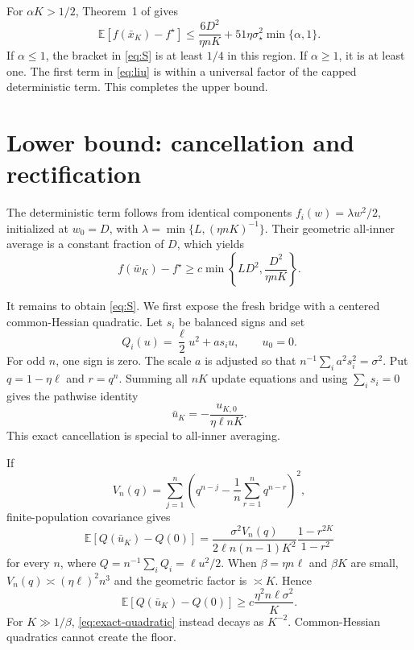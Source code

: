 \documentclass{article}
\theoremstyle{remark}
\newcommand{\E}{\mathbb E}
\newcommand{\1}{\mathbf 1}
\begin{document}
For $\alpha K>1/2$, Theorem~1 of \citet{liu2026dominates} gives
\begin{equation}
 \E[f(\bar x_K)-f^\star]
 \leq \frac{6D^2}{\eta nK}
 +51\eta\sigma_\star^2\min\{\alpha,1\}.               \label{eq:liu}
\end{equation}
If $\alpha\leq1$, the bracket in \eqref{eq:S} is at least $1/4$ in this region. If $\alpha\geq1$, it is at least one. The first term in \eqref{eq:liu} is within a universal factor of the capped deterministic term. This completes the upper bound.

\section{Lower bound: cancellation and rectification}
\label{sec:lower}

The deterministic term follows from identical components $f_i(w)=\lambda w^2/2$, initialized at $w_0=D$, with $\lambda=\min\{L,(\eta nK)^{-1}\}$. Their geometric all-inner average is a constant fraction of $D$, which yields
\begin{equation}
 f(\bar w_K)-f^\star
 \geq c\min\left\{LD^2,\frac{D^2}{\eta nK}\right\}.   \label{eq:det-lower}
\end{equation}

It remains to obtain \eqref{eq:S}. We first expose the fresh bridge with a centered common-Hessian quadratic. Let $s_i$ be balanced signs and set
\begin{equation}
 Q_i(u)=\frac\ell2u^2+a s_i u,
 \qquad u_0=0.                                        \label{eq:centered}
\end{equation}
For odd $n$, one sign is zero. The scale $a$ is adjusted so that $n^{-1}\sum_i a^2s_i^2=\sigma^2$. Put $q=1-\eta\ell$ and $r=q^n$. Summing all $nK$ update equations and using $\sum_i s_i=0$ gives the pathwise identity
\begin{equation}
 \boxed{\quad \bar u_K=-\frac{u_{K,0}}{\eta\ell nK}.\quad}             \label{eq:telescoping}
\end{equation}
This exact cancellation is special to all-inner averaging.

If \[ V_n(q)=\sum_{j=1}^n\left(q^{n-j}-\frac1n \sum_{r=1}^nq^{n-r}\right)^2, \] finite-population covariance gives
\begin{equation}
 \E[Q(\bar u_K)-Q(0)]
 =\frac{\sigma^2V_n(q)}{2\ell n(n-1)K^2}
   \frac{1-r^{2K}}{1-r^2}                              \label{eq:exact-quadratic}
\end{equation}
for every $n$, where $Q=n^{-1}\sum_iQ_i=\ell u^2/2$. When $\beta=\eta n\ell$ and $\beta K$ are small, $V_n(q)\asymp(\eta\ell)^2n^3$ and the geometric factor is $\asymp K$. Hence
\begin{equation}
 \E[Q(\bar u_K)-Q(0)]
 \geq c\frac{\eta^2n\ell\sigma^2}{K}.                \label{eq:bridge-lower}
\end{equation}
For $K\gg1/\beta$, \eqref{eq:exact-quadratic} instead decays as $K^{-2}$. Common-Hessian quadratics cannot create the floor.
\end{document}
